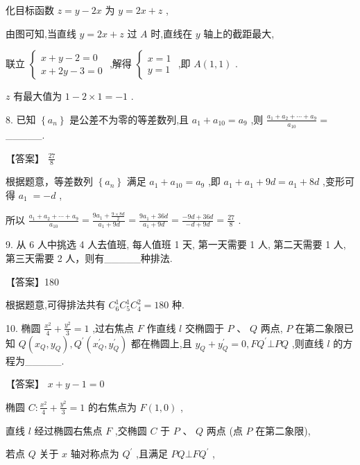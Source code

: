 \documentclass[10pt]{article}
\begin{document}
化目标函数 \(z = y - {2x}\) 为 \(y = {2x} + z\) ,

由图可知,当直线 \(y = {2x} + z\) 过 \(A\) 时,直线在 \(y\) 轴上的截距最大,

联立 \(\left\{  \begin{array}{l} x + y - 2 = 0 \\  x + {2y} - 3 = 0 \end{array}\right.\) ,解得 \(\left\{  \begin{array}{l} x = 1 \\  y = 1 \end{array}\right.\) ,即 \(A\left( {1,1}\right)\) .

\(z\) 有最大值为 \(1 - 2 \times  1 =  - 1\) .

8. 已知 \(\left\{  {a}_{n}\right\}\) 是公差不为零的等差数列,且 \({a}_{1} + {a}_{10} = {a}_{9}\) ,则 \(\frac{{a}_{1} + {a}_{2} + \cdots  + {a}_{9}}{{a}_{10}} =\) \_\_\_\_\_.

【答案】 \(\frac{27}{8}\)

根据题意，等差数列 \(\left\{  {a}_{n}\right\}\) 满足 \({a}_{1} + {a}_{10} = {a}_{9}\) ,即 \({a}_{1} + {a}_{1} + {9d} = {a}_{1} + {8d}\) ,变形可得 \({a}_{1} \; =  - d\) ,

所以 \(\frac{{a}_{1} + {a}_{2} + \cdots  + {a}_{9}}{{a}_{10}} = \frac{9{a}_{1} + \frac{9 \times  {8d}}{2}}{{a}_{1} + {9d}} = \frac{9{a}_{1} + {36d}}{{a}_{1} + {9d}} = \frac{-{9d} + {36d}}{-d + {9d}} = \frac{27}{8}\) .

9. 从 6 人中挑选 4 人去值班, 每人值班 1 天, 第一天需要 1 人, 第二天需要 1 人, 第三天需要 2 人，则有\_\_\_\_\_种排法.

【答案】180

根据题意,可得排法共有 \({C}_{6}^{1}{C}_{5}^{1}{C}_{4}^{2} = {180}\) 种.

10. 椭圆 \(\frac{{x}^{2}}{4} + \frac{{y}^{2}}{3} = 1\) ,过右焦点 \(F\) 作直线 \(l\) 交椭圆于 \(P\text{ 、 }Q\) 两点, \(P\) 在第二象限已知 \(Q\left( {{x}_{Q},{y}_{Q}}\right) ,{Q}^{\prime }\left( {{x}_{Q}^{\prime },{y}_{Q}^{\prime }}\right)\) 都在椭圆上,且 \({y}_{Q} + {y}_{Q}^{\prime } = 0,F{Q}^{\prime } \bot  {PQ}\) ,则直线 \(l\) 的方程为\_\_\_\_\_.

【答案】 \(x + y - 1 = 0\)

椭圆 \(C : \frac{{x}^{2}}{4} + \frac{{y}^{2}}{3} = 1\) 的右焦点为 \(F\left( {1,0}\right)\) ,

直线 \(l\) 经过椭圆右焦点 \(F\) ,交椭圆 \(C\) 于 \(P\text{ 、 }Q\) 两点 (点 \(P\) 在第二象限),

若点 \(Q\) 关于 \(x\) 轴对称点为 \({Q}^{\prime }\) ,且满足 \({PQ} \bot  F{Q}^{\prime }\) ,
\end{document}

